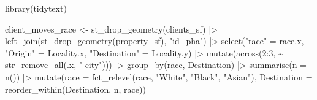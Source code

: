 \documentclass[
  letterpaper,
  DIV=11,
  numbers=noendperiod]{scrartcl}
\newenvironment{Shaded}{\begin{snugshade}}{\end{snugshade}}
\newcommand{\AttributeTok}[1]{\textcolor[rgb]{0.40,0.45,0.13}{#1}}
\newcommand{\DecValTok}[1]{\textcolor[rgb]{0.68,0.00,0.00}{#1}}
\newcommand{\FunctionTok}[1]{\textcolor[rgb]{0.28,0.35,0.67}{#1}}
\newcommand{\NormalTok}[1]{\textcolor[rgb]{0.00,0.23,0.31}{#1}}
\newcommand{\OtherTok}[1]{\textcolor[rgb]{0.00,0.23,0.31}{#1}}
\newcommand{\SpecialCharTok}[1]{\textcolor[rgb]{0.37,0.37,0.37}{#1}}
\newcommand{\StringTok}[1]{\textcolor[rgb]{0.13,0.47,0.30}{#1}}
\begin{document}
\begin{Shaded}
\begin{Highlighting}[]
\FunctionTok{library}\NormalTok{(tidytext)}

\NormalTok{client\_moves\_race }\OtherTok{\textless{}{-}} \FunctionTok{st\_drop\_geometry}\NormalTok{(clients\_sf) }\SpecialCharTok{|\textgreater{}} 
  \FunctionTok{left\_join}\NormalTok{(}\FunctionTok{st\_drop\_geometry}\NormalTok{(property\_sf), }\StringTok{"id\_pha"}\NormalTok{) }\SpecialCharTok{|\textgreater{}} 
  \FunctionTok{select}\NormalTok{(}\StringTok{"race"} \OtherTok{=} \StringTok{\textquotesingle{}race.x\textquotesingle{}}\NormalTok{, }\StringTok{"Origin"} \OtherTok{=} \StringTok{\textquotesingle{}Locality.x\textquotesingle{}}\NormalTok{, }\StringTok{"Destination"} \OtherTok{=} \StringTok{\textquotesingle{}Locality.y\textquotesingle{}}\NormalTok{) }\SpecialCharTok{|\textgreater{}} 
  \FunctionTok{mutate}\NormalTok{(}\FunctionTok{across}\NormalTok{(}\DecValTok{2}\SpecialCharTok{:}\DecValTok{3}\NormalTok{, }\SpecialCharTok{\textasciitilde{}} \FunctionTok{str\_remove\_all}\NormalTok{(.x, }\StringTok{" city"}\NormalTok{))) }\SpecialCharTok{|\textgreater{}} 
  \FunctionTok{group\_by}\NormalTok{(race, Destination) }\SpecialCharTok{|\textgreater{}} 
  \FunctionTok{summarise}\NormalTok{(}\AttributeTok{n =} \FunctionTok{n}\NormalTok{()) }\SpecialCharTok{|\textgreater{}} 
  \FunctionTok{mutate}\NormalTok{(}\AttributeTok{race =} \FunctionTok{fct\_relevel}\NormalTok{(race, }\StringTok{"White"}\NormalTok{, }\StringTok{"Black"}\NormalTok{, }\StringTok{"Asian"}\NormalTok{),}
         \AttributeTok{Destination =} \FunctionTok{reorder\_within}\NormalTok{(Destination, n, race))}


\end{Highlighting}
\end{Shaded}
\end{document}

